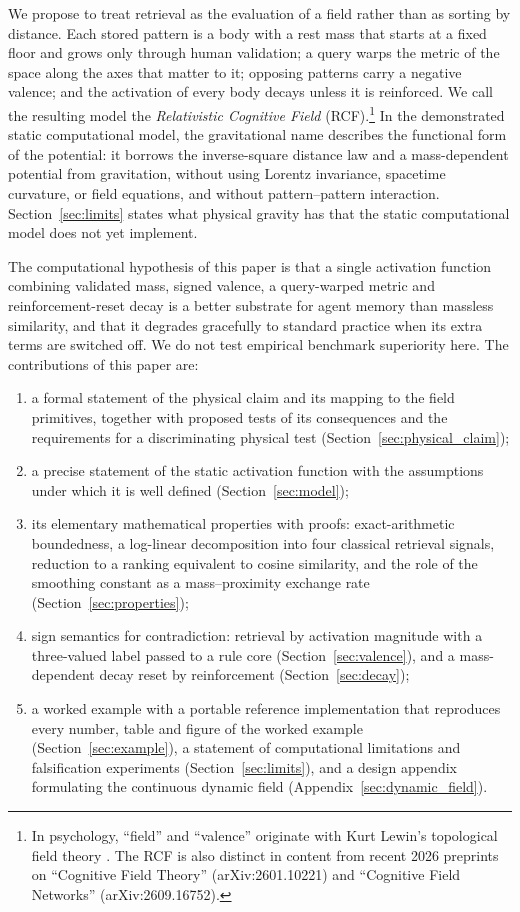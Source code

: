 \documentclass[11pt]{article}
\theoremstyle{remark}
\begin{document}
We propose to treat retrieval as the evaluation of a field rather than as sorting by distance. Each stored pattern is a body with a rest mass that starts at a fixed floor and grows only through human validation; a query warps the metric of the space along the axes that matter to it; opposing patterns carry a negative valence; and the activation of every body decays unless it is reinforced. We call the resulting model the \emph{Relativistic Cognitive Field} (RCF).\footnote{In psychology, ``field'' and ``valence'' originate with Kurt Lewin's topological field theory \citep{lewin1936principles}. The RCF is also distinct in content from recent 2026 preprints on ``Cognitive Field Theory'' (arXiv:2601.10221) and ``Cognitive Field Networks'' (arXiv:2609.16752).} In the demonstrated static computational model, the gravitational name describes the functional form of the potential: it borrows the inverse-square distance law and a mass-dependent potential from gravitation, without using Lorentz invariance, spacetime curvature, or field equations, and without pattern--pattern interaction. Section~\ref{sec:limits} states what physical gravity has that the static computational model does not yet implement.

The computational hypothesis of this paper is that a single activation function combining validated mass, signed valence, a query-warped metric and reinforcement-reset decay is a better substrate for agent memory than massless similarity, and that it degrades gracefully to standard practice when its extra terms are switched off. We do not test empirical benchmark superiority here. The contributions of this paper are:
\begin{enumerate}
  \item a formal statement of the physical claim and its mapping to the field primitives, together with proposed tests of its consequences and the requirements for a discriminating physical test (Section~\ref{sec:physical_claim});
  \item a precise statement of the static activation function with the assumptions under which it is well defined (Section~\ref{sec:model});
  \item its elementary mathematical properties with proofs: exact-arithmetic boundedness, a log-linear decomposition into four classical retrieval signals, reduction to a ranking equivalent to cosine similarity, and the role of the smoothing constant as a mass--proximity exchange rate (Section~\ref{sec:properties});
  \item sign semantics for contradiction: retrieval by activation magnitude with a three-valued label passed to a rule core (Section~\ref{sec:valence}), and a mass-dependent decay reset by reinforcement (Section~\ref{sec:decay});
  \item a worked example with a portable reference implementation that reproduces every number, table and figure of the worked example (Section~\ref{sec:example}), a statement of computational limitations and falsification experiments (Section~\ref{sec:limits}), and a design appendix formulating the continuous dynamic field (Appendix~\ref{sec:dynamic_field}).
\end{enumerate}
\end{document}
